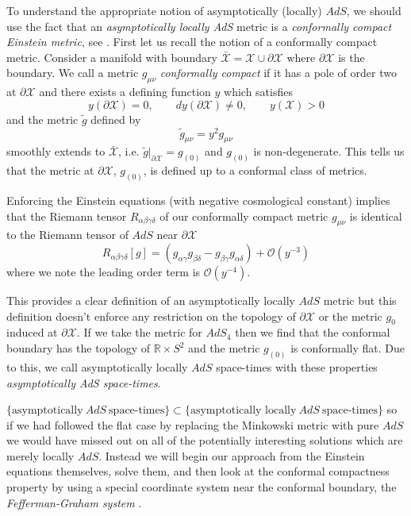 \documentclass[a4paper,11pt]{article}
\numberwithin{equation}{section}
\begin{document}
To understand the appropriate notion of asymptotically (locally) $AdS$, we should use the fact that an \textit{asymptotically locally AdS} metric is a \textit{conformally compact Einstein metric}, see  \cite{Skenderis:2002wp}. 
First let us recall the notion of a conformally compact metric. Consider a manifold with boundary $\bar{\mathcal{X}}=\mathcal{X} \cup \partial \mathcal{X}$ where $\partial \mathcal{X}$ is the boundary. We call a metric $g_{\mu \nu}$ \textit{conformally compact} if it has a pole of order two at $\partial \mathcal{X}$ and there exists a defining function $y$ which satisfies 
\begin{equation}
y(\partial \mathcal{X})=0, \qquad dy(\partial \mathcal{X}) \neq 0, \qquad y(\mathcal{X}) > 0  
\end{equation} 
and the metric $\tilde{g}$ defined by 
\begin{equation}
\tilde{g}_{\mu \nu}=y^2 g_{\mu \nu} 
 \label{eq: double_pole_metric}
\end{equation}
smoothly extends to $\bar{\mathcal{X}}$, i.e. $\tilde{g}|_{\partial \mathcal{X}}=g_{(0)}$ and $g_{(0)}$ is non-degenerate. This tells us that the metric at $\partial \mathcal{X}$, $g_{(0)}$, is defined up to a conformal class of metrics. \par

Enforcing the  Einstein equations (with negative cosmological constant) implies that the Riemann tensor $R_{\alpha \beta \gamma \delta}$ of our conformally compact metric $g_{\mu \nu}$ is identical to the Riemann tensor of $AdS$ near $\partial \mathcal{X}$
\begin{equation}
R_{\alpha \beta \gamma \delta}[g]=(g_{\alpha \gamma} g_{\beta \delta} - g_{\beta \gamma} g_{\alpha \delta})+\mathcal{O}(y^{-3})
\end{equation}
where we note the leading order term is $\mathcal{O}(y^{-4})$. 

This provides a clear definition of an asymptotically locally $AdS$ metric but this definition doesn't enforce any restriction on the topology of $\partial \mathcal{X}$ or the metric $g_{0}$ induced at $\partial \mathcal{X}$. If we take the metric for $AdS_4$ then we find that the conformal boundary has the topology of $\mathbb{R} \times S^2$ and the metric $g_{(0)}$ is conformally flat. Due to this, we call asymptotically locally $AdS$ space-times with these properties \textit{asymptotically AdS space-times}.
 
$\{ \text{asymptotically} \: AdS \: \text{space-times} \} \subset \{ \text{asymptotically locally} \: AdS \: \text{space-times} \}$ so if we had followed the flat case by replacing the Minkowski metric with pure $AdS$ we would have missed out on all of the potentially interesting solutions which are merely locally $AdS$. Instead we will begin our approach from the Einstein equations themselves, solve them, and then look at the conformal compactness property by using a special coordinate system near the conformal boundary, the \textit{Fefferman-Graham system} \cite{Fefferman:1985zza}.
\end{document}
